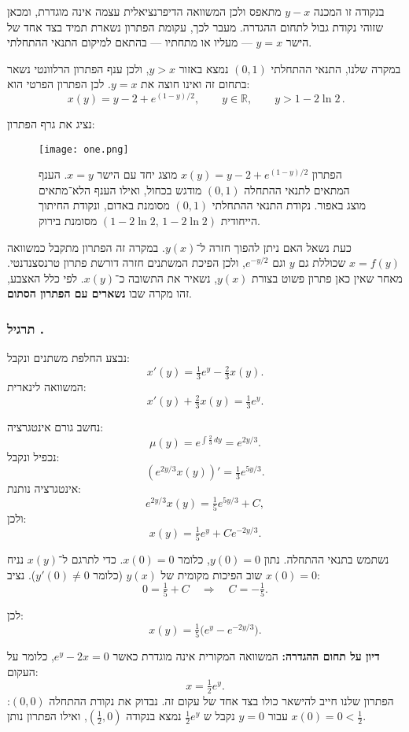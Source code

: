 \documentclass{article}
\numberwithin{equation}{section}
\newcounter{solution}[section]
\renewcommand{\thesolution}{\thesection.\arabic{solution}}
\newcommand{\solution}{%
  \refstepcounter{solution}%
  \subsubsection*{תרגיל \thesolution}%
  \label{sol:\thesolution}%
}
\begin{document}
בנקודה זו המכנה $y-x$ מתאפס ולכן המשוואה הדיפרנציאלית עצמה אינה מוגדרת, 
ומכאן שזוהי נקודת גבול לתחום ההגדרה. 
מעבר לכך, עקומת הפתרון נשארת תמיד בצד אחד של הישר $y=x$ — מעליו או מתחתיו — 
בהתאם למיקום התנאי ההתחלתי. 

במקרה שלנו, התנאי ההתחלתי $(0,1)$ נמצא באזור $y>x$, 
ולכן ענף הפתרון הרלוונטי נשאר בתחום זה ואינו חוצה את $y=x$. 
לכן הפתרון הפרטי הוא:
\[
\boxed{\, x(y) = y - 2 + e^{(1-y)/2}, \qquad y\in\mathbb{R} ,\qquad y > 1-2\ln 2 \,}.
\]


נציג את גרף הפתרון:
\begin{figure}[H]
    \centering
    \texttt{[image: one.png]}
    \caption{הפתרון $x(y) = y - 2 + e^{(1-y)/2}$ מוצג יחד עם הישר $x=y$. 
    הענף המתאים לתנאי ההתחלה $(0,1)$ מודגש בכחול, 
    ואילו הענף הלא־מתאים מוצג באפור. 
    נקודת התנאי ההתחלתי $(0,1)$ מסומנת באדום, 
    ונקודת החיתוך הייחודית $(1-2\ln 2,\,1-2\ln 2)$ מסומנת בירוק.}
    \label{fig:xofy_branches}
\end{figure}



כעת נשאל האם ניתן להפוך חזרה ל־$y(x)$. במקרה זה הפתרון מתקבל כמשוואה $x=f(y)$ שכוללת גם $y$ וגם $e^{-y/2}$, ולכן הפיכת המשתנים חזרה דורשת פתרון טרנסצנדנטי. מאחר שאין כאן פתרון פשוט בצורת $y(x)$, נשאיר את התשובה כ־$x(y)$. לפי כלל האצבע, זהו מקרה שבו \textbf{נשארים עם הפתרון הסתום}.



\solution{}
נבצע החלפת משתנים ונקבל:
\[
x'(y) = \tfrac{1}{3} e^y - \tfrac{2}{3}x(y).
\]
המשוואה לינארית:
\[
x'(y) + \tfrac{2}{3}x(y) = \tfrac{1}{3}e^y.
\]

נחשב גורם אינטגרציה:
\[
\mu(y) = e^{\int \tfrac{2}{3}\,dy} = e^{2y/3}.
\]
נכפיל ונקבל:
\[
(e^{2y/3}x(y))' = \tfrac{1}{3} e^{5y/3}.
\]
אינטגרציה נותנת:
\[
e^{2y/3}x(y) = \tfrac{1}{5} e^{5y/3} + C,
\]
ולכן:
\[
x(y) = \tfrac{1}{5} e^y + C e^{-2y/3}.
\]

נשתמש בתנאי ההתחלה. נתון $y(0)=0$, כלומר $x(0)=0$. כדי לתרגם ל־$x(y)$ נניח שוב הפיכות מקומית של $y(x)$ (כלומר $y'(0)\neq 0$). נציב $x(0)=0$:
\[
0 = \tfrac{1}{5} + C \quad \Rightarrow \quad C=-\tfrac{1}{5}.
\]

לכן:
\[
\boxed{\, x(y) = \tfrac{1}{5}\big(e^y - e^{-2y/3}\big). \,}
\]

\textbf{דיון על תחום ההגדרה:}  
המשוואה המקורית אינה מוגדרת כאשר $e^y - 2x = 0$, כלומר על העקום:
\[
x = \tfrac{1}{2} e^y.
\]
הפתרון שלנו חייב להישאר כולו בצד אחד של עקום זה.  
נבדוק את נקודת ההתחלה $(0,0)$: עבור $y=0$ נקבל ש $\frac{1}{2}e^{y}$ נמצא בנקודה $(\tfrac{1}{2},0)$, ואילו הפתרון נותן $x(0)=0 < \tfrac{1}{2}$.  
\end{document}
